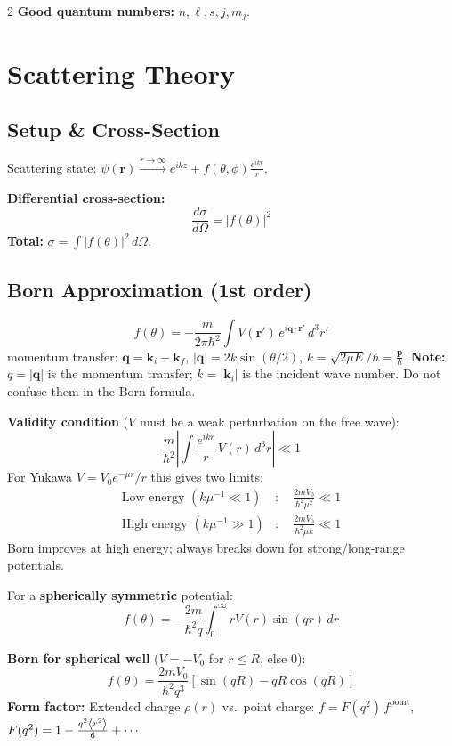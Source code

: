 \documentclass[9pt,a4paper]{article} %
\newcommand{\bs}[1]{\symbf{#1}}\usepackage{empheq}   %
\begin{document}
\begin{multicols}{2}
\textbf{Good quantum numbers:} $n,\ell,s,j,m_j$.

\section{Scattering Theory}

\subsection{Setup \& Cross-Section}
Scattering state: $\psi(\mathbf{r})\xrightarrow{r\to\infty} e^{ikz}+f(\theta,\phi)\frac{e^{ikr}}{r}$.

\textbf{Differential cross-section:}
\[
\frac{d\sigma}{d\Omega}=|f(\theta)|^2
\]
\textbf{Total:} $\sigma=\int|f(\theta)|^2\,d\Omega$.

\subsection{Born Approximation (1st order)}
\[
\boxed{f(\theta)=-\frac{m}{2\pi\hbar^2}\int V(\mathbf{r}')\,e^{i\mathbf{q}\cdot\mathbf{r}'}\,d^3r'}
\]
momentum transfer: $\mathbf{q}=\mathbf{k}_i-\mathbf{k}_f$, $|\mathbf{q}|=2k\sin(\theta/2)$, $k = \sqrt{2\mu E}/\hbar=\frac{\bs p}{\hbar}$.
{\footnotesize\textbf{Note:} $q=|\mathbf{q}|$ is the momentum transfer; $k=|\mathbf{k}_i|$ is the incident wave number. Do not confuse them in the Born formula.}

\textbf{Validity condition} ($V$ must be a weak perturbation on the free wave):
\[
  \frac{m}{\hbar^2}\left|\int \frac{e^{ikr}}{r}\,V(r)\,d^3r\right| \ll 1
\]
For Yukawa $V=V_0 e^{-\mu r}/r$ this gives two limits:
\begin{align*}
  \text{Low energy }(k\mu^{-1}\ll 1)&:\quad \frac{2mV_0}{\hbar^2\mu^2}\ll 1\\
  \text{High energy }(k\mu^{-1}\gg 1)&:\quad \frac{2mV_0}{\hbar^2\mu k}\ll 1
\end{align*}
{\footnotesize Born improves at high energy; always breaks down for strong/long-range potentials.}

For a \textbf{spherically symmetric} potential:
\[
f(\theta) = -\frac{2m}{\hbar^2 q} \int_0^\infty r V(r) \sin(qr) \, dr
\]

{\footnotesize
\textbf{Born for spherical well} ($V=-V_0$ for $r\le R$, else $0$):
\[
f(\theta)=\frac{2mV_0}{\hbar^2 q^3}[\sin(qR)-qR\cos(qR)]
\]
\textbf{Form factor:} Extended charge $\rho(r)$ vs.\ point charge:
$f=F(q^2)\,f^{\text{point}}$,\;
$F(q^2)=1-\frac{q^2\ev{r^2}}{6}+\cdots$

}
\end{multicols}
\end{document}
